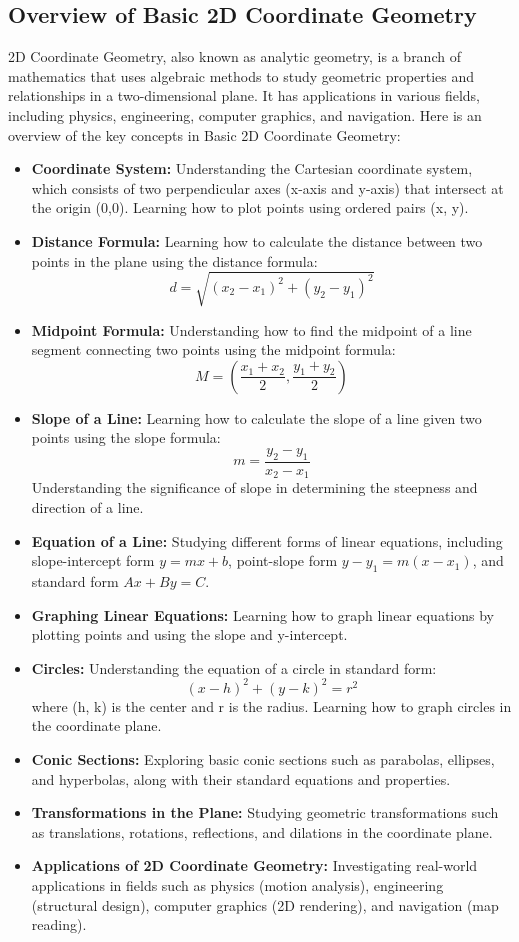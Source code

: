 \documentclass[openany]{book}
\begin{document}
\subsection{Overview of Basic 2D Coordinate Geometry}
2D Coordinate Geometry, also known as analytic geometry, is a branch of mathematics that uses algebraic methods to study geometric properties and relationships in a two-dimensional plane. It has applications in various fields, including physics, engineering, computer graphics, and navigation. Here is an overview of the key concepts in Basic 2D Coordinate Geometry:
\begin{itemize}
    \item \textbf{Coordinate System:} Understanding the Cartesian coordinate system, which consists of two perpendicular axes (x-axis and y-axis) that intersect at the origin (0,0). Learning how to plot points using ordered pairs (x, y).
    \item \textbf{Distance Formula:} Learning how to calculate the distance between two points in the plane using the distance formula: 
    \[
    d = \sqrt{(x_2 - x_1)^2 + (y_2 - y_1)^2}
    \]
    \item \textbf{Midpoint Formula:} Understanding how to find the midpoint of a line segment connecting two points using the midpoint formula:
    \[
    M = \left( \frac{x_1 + x_2}{2}, \frac{y_1 + y_2}{2} \right)
    \]
    \item \textbf{Slope of a Line:} Learning how to calculate the slope of a line given two points using the slope formula:
    \[
    m = \frac{y_2 - y_1}{x_2 - x_1}
    \]
    Understanding the significance of slope in determining the steepness and direction of a line.
    \item \textbf{Equation of a Line:} Studying different forms of linear equations, including slope-intercept form $y = mx + b$, point-slope form $y - y_1 = m(x - x_1)$, and standard form $Ax + By = C$.
    \item \textbf{Graphing Linear Equations:} Learning how to graph linear equations by plotting points and using the slope and y-intercept.
    \item \textbf{Circles:} Understanding the equation of a circle in standard form:
    \[
    (x - h)^2 + (y - k)^2 = r^2
    \]
    where (h, k) is the center and r is the radius. Learning how to graph circles in the coordinate plane.
    \item \textbf{Conic Sections:} Exploring basic conic sections such as parabolas, ellipses, and hyperbolas, along with their standard equations and properties.
    \item \textbf{Transformations in the Plane:} Studying geometric transformations such as translations, rotations, reflections, and dilations in the coordinate plane.
    \item \textbf{Applications of 2D Coordinate Geometry:} Investigating real-world applications in fields such as physics (motion analysis), engineering (structural design), computer graphics (2D rendering), and navigation (map reading).
\end{itemize}
\end{document}
